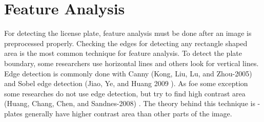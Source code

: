 \section{Feature Analysis}

For detecting the license plate, feature analysis must be done after an image is preprocessed properly.
Checking the edges for detecting any rectangle shaped area is the most common technique for feature analysis.
To detect the plate boundary, some researchers use horizontal lines and others look for vertical lines.
Edge detection is commonly done with Canny (Kong, Liu, Lu, and Zhou-2005) \cite{Kong2005}  and Sobel edge detection (Jiao, Ye, and Huang 2009 \cite{jiao_ye_huang_2009}).
As foe some exception some researches do not use edge detection, but try to find high contrast area (Huang, Chang, Chen, and Sandnes-2008) \cite{HUANG2008}. The theory behind this technique is - plates generally have higher contrast area than other parts of the image.